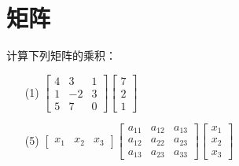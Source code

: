 \section{矩阵}

\begin{problem}
计算下列矩阵的乘积：

\begin{enumerate}
    \item[(1)] \(\begin{bmatrix}
            4 & 3 & 1 \\1&-2&3\\5&7&0
        \end{bmatrix}\begin{bmatrix}
            7 \\2\\1
        \end{bmatrix}\)
    \item[(5)] \(\begin{bmatrix}
            x_1 & x_2 & x_3
        \end{bmatrix}
        \begin{bmatrix}
            a_{11} & a_{12} & a_{13} \\
            a_{12} & a_{22} & a_{23} \\
            a_{13} & a_{23} & a_{33}
        \end{bmatrix}
        \begin{bmatrix}
            x_1 \\x_2\\x_3
        \end{bmatrix}\)
\end{enumerate}
\end{problem}
